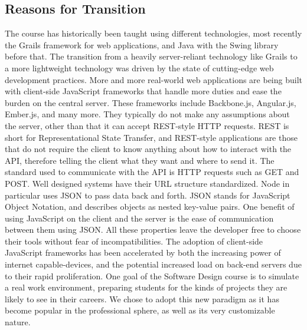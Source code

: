 \documentclass[12pt]{article}
\newcommand{\comment}[1]{{\bf \tt  {#1}}}
\newcommand{\emcomment}[1]{\textcolor{ForestGreen}{\comment{Elena: {#1}}}}
\begin{document}
\subsection{Reasons for Transition}\label{sec:reasons_for_transition}
The course has historically been taught using different technologies, most recently the Grails framework for web applications, and Java with the Swing library before that. The transition from a heavily server-reliant technology like Grails to a more lightweight technology was driven by the state of cutting-edge web development practices. More and more real-world web applications are being built with client-side JavaScript frameworks that handle more duties and ease the burden on the central server. These frameworks include Backbone.js, Angular.js, Ember.js, and many more. They typically do not make any assumptions about the server, other than that it can accept REST-style HTTP requests. REST is short for Representational State Transfer, and REST-style applications are those that do not require the client to know anything about how to interact with the API, therefore telling the client what they want and where to send it. The standard used to communicate with the API is HTTP requests such as GET and POST. Well designed systems have their URL structure standardized. Node in particular uses JSON to pass data back and forth. JSON stands for JavaScript Object Notation, and describes objects as nested key-value pairs. One benefit of using JavaScript on the client and the server is the ease of communication between them using JSON. All these properties leave the developer free to choose their tools without fear of incompatibilities. The adoption of client-side JavaScript frameworks has been accelerated by both the increasing power of internet capable-devices, and the potential increased load on back-end servers due to their rapid proliferation. One goal of the Software Design course is to simulate a real work environment, preparing students for the kinds of projects they are likely to see in their careers. We chose to adopt this new paradigm as it has become popular in the professional sphere, as well as its very customizable nature. 
\end{document}
